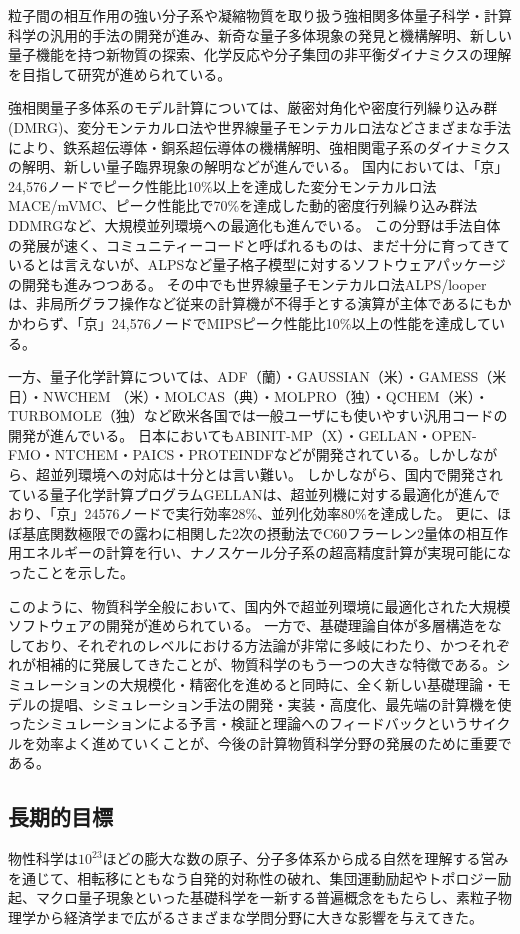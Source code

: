 粒子間の相互作用の強い分子系や凝縮物質を取り扱う強相関多体量子科学・計算科学の汎用的手法の開発が進み、新奇な量子多体現象の発見と機構解明、新しい量子機能を持つ新物質の探索、化学反応や分子集団の非平衡ダイナミクスの理解を目指して研究が進められている。

強相関量子多体系のモデル計算については、厳密対角化や密度行列繰り込み群(DMRG)、変分モンテカルロ法や世界線量子モンテカルロ法などさまざまな手法により、鉄系超伝導体・銅系超伝導体の機構解明、強相関電子系のダイナミクスの解明、新しい量子臨界現象の解明などが進んでいる。
国内においては、「京」24,576ノードでピーク性能比10\%以上を達成した変分モンテカルロ法MACE/mVMC、ピーク性能比で70\%を達成した動的密度行列繰り込み群法DDMRGなど、大規模並列環境への最適化も進んでいる。
この分野は手法自体の発展が速く、コミュニティーコードと呼ばれるものは、まだ十分に育ってきているとは言えないが、ALPSなど量子格子模型に対するソフトウェアパッケージの開発も進みつつある。
その中でも世界線量子モンテカルロ法ALPS/looperは、非局所グラフ操作など従来の計算機が不得手とする演算が主体であるにもかかわらず、「京」24,576ノードでMIPSピーク性能比10\%以上の性能を達成している。

一方、量子化学計算については、ADF（蘭）・GAUSSIAN（米）・GAMESS（米日）・NWCHEM （米）・MOLCAS（典）・MOLPRO（独）・QCHEM（米）・TURBOMOLE（独）など欧米各国では一般ユーザにも使いやすい汎用コードの開発が進んでいる。
日本においてもABINIT-MP（X）・GELLAN・OPEN-FMO・NTCHEM・PAICS・PROTEINDFなどが開発されている。しかしながら、超並列環境への対応は十分とは言い難い。
しかしながら、国内で開発されている量子化学計算プログラムGELLANは、超並列機に対する最適化が進んでおり、「京」24576ノードで実行効率28\%、並列化効率80\%を達成した。
更に、ほぼ基底関数極限での露わに相関した2次の摂動法でC60フラーレン2量体の相互作用エネルギーの計算を行い、ナノスケール分子系の超高精度計算が実現可能になったことを示した。

このように、物質科学全般において、国内外で超並列環境に最適化された大規模ソフトウェアの開発が進められている。
一方で、基礎理論自体が多層構造をなしており、それぞれのレベルにおける方法論が非常に多岐にわたり、かつそれぞれが相補的に発展してきたことが、物質科学のもう一つの大きな特徴である。シミュレーションの大規模化・精密化を進めると同時に、全く新しい基礎理論・モデルの提唱、シミュレーション手法の開発・実装・高度化、最先端の計算機を使ったシミュレーションによる予言・検証と理論へのフィードバックというサイクルを効率よく進めていくことが、今後の計算物質科学分野の発展のために重要である。

\subsection{長期的目標}
物性科学は$10^{23}$ほどの膨大な数の原子、分子多体系から成る自然を理解する営みを通じて、相転移にともなう自発的対称性の破れ、集団運動励起やトポロジー励起、マクロ量子現象といった基礎科学を一新する普遍概念をもたらし、素粒子物理学から経済学まで広がるさまざまな学問分野に大きな影響を与えてきた。

